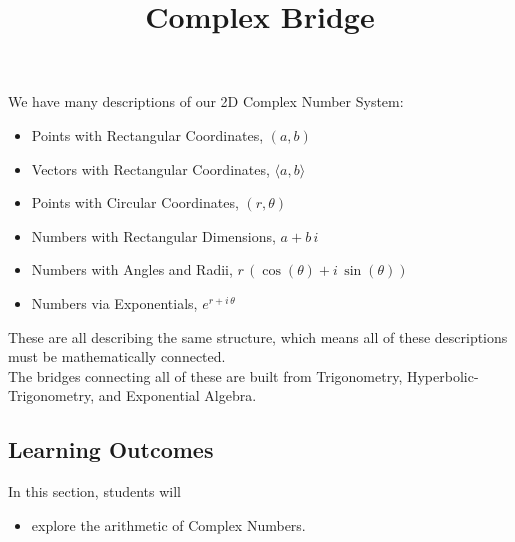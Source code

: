 \documentclass{ximera}
\title{Complex Bridge}
\begin{document}
\begin{abstract}
\end{abstract}
\maketitle




We have many descriptions of our 2D Complex Number System:

\begin{itemize}
\item Points with Rectangular Coordinates, $(a,b)$
\item Vectors with Rectangular Coordinates, $\langle a, b \rangle$
\item Points with Circular Coordinates, $(r,\theta)$
\item Numbers with Rectangular Dimensions, $a + b \, i$
\item Numbers with Angles and Radii, $r \, (\cos(\theta) + i \, \sin(\theta))$
\item Numbers via Exponentials, $e^{r + i \, \theta}$
\end{itemize}

These are all describing the same structure, which means all of these descriptions must be mathematically connected. \\


The bridges connecting all of these are built from Trigonometry, Hyperbolic-Trigonometry, and Exponential Algebra.





\subsection*{Learning Outcomes}

\begin{sectionOutcomes}
In this section, students will 

\begin{itemize}
\item explore the arithmetic of Complex Numbers.
\end{itemize}
\end{sectionOutcomes}
\end{document}
